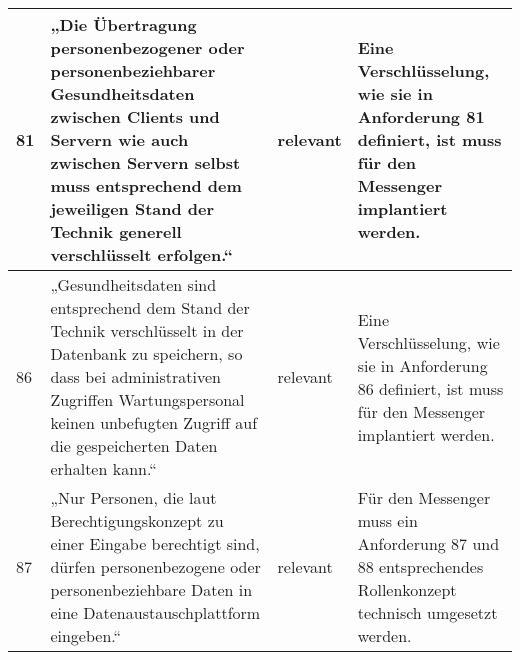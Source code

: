 \begin{longtable}{p{0.6cm}|p{6cm}|p{2cm}|p{6cm}}
    81     & „Die Übertragung personenbezogener oder personenbeziehbarer Gesundheitsdaten zwischen Clients und Servern wie auch zwischen Servern selbst muss entsprechend dem jeweiligen Stand der Technik generell verschlüsselt erfolgen.“                                                                      & relevant           & Eine Verschlüsselung, wie sie in Anforderung 81 definiert, ist muss für den Messenger implantiert werden.                                                                                                                                                                                                                                                                                                                                                                                                                                                             \\ \hline
    86     & „Gesundheitsdaten sind entsprechend dem Stand der Technik verschlüsselt in der Datenbank zu speichern, so dass bei administrativen Zugriffen Wartungspersonal keinen unbefugten Zugriff auf die gespeicherten Daten erhalten kann.“                                                                  & relevant           & Eine Verschlüsselung, wie sie in Anforderung 86 definiert, ist muss für den Messenger implantiert werden.                                                                                                                                                                                                                                                                                                                                                                                                                                                             \\ \hline
    87     & „Nur Personen, die laut Berechtigungskonzept zu einer Eingabe berechtigt sind, dürfen personenbezogene oder personenbeziehbare Daten in eine Datenaustauschplattform eingeben.“                                                                                                                      & relevant           & Für den Messenger muss ein Anforderung 87 und 88 entsprechendes Rollenkonzept technisch umgesetzt werden.                                                                                                                                                                                                                                                                                                                                                                                                                                                           \\ \hline

\end{longtable}
